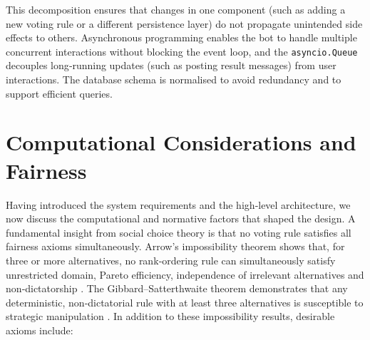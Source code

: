 This decomposition ensures that changes in one component (such as
adding a new voting rule or a different persistence layer) do not
propagate unintended side effects to others.  Asynchronous programming
enables the bot to handle multiple concurrent interactions without
blocking the event loop, and the \texttt{asyncio.Queue} decouples
long‑running updates (such as posting result messages) from user
interactions.  The database schema is normalised to avoid redundancy
and to support efficient queries.

\section{Computational Considerations and Fairness}
Having introduced the system requirements and the high‑level
architecture, we now discuss the computational and normative factors
that shaped the design.  A fundamental insight from social choice theory
is that no voting rule satisfies all fairness axioms simultaneously.
Arrow’s impossibility theorem shows that, for three or more
alternatives, no rank‑ordering rule can simultaneously satisfy
unrestricted domain, Pareto efficiency, independence of irrelevant
alternatives and non‑dictatorship \cite{Arrow1951}.  The Gibbard–Satterthwaite
theorem demonstrates that any deterministic, non‑dictatorial rule with at
least three alternatives is susceptible to strategic manipulation \cite{Gibbard1973,Satterthwaite1975}.  In
addition to these impossibility results, desirable axioms include:

